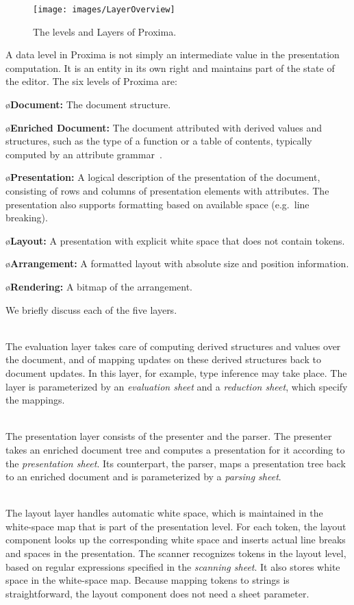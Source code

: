 \documentclass[12pt]{article}
\begin{document}
\begin{figure}[ht]
\centering
\texttt{[image: images/LayerOverview]}
\caption{The levels and Layers of Proxima.}
\label{fig:levelsAndLayers}
\end{figure}

A data level in Proxima is not simply an intermediate value in the presentation computation. It is an entity in its own right and maintains part of the state of the editor. The six levels of Proxima are:


\bl
\o {\bf Document:} The document structure.

\o {\bf Enriched Document:} The document attributed with derived values and structures, such as the type of a function or a table of contents, typically computed by an attribute grammar~\cite{reps84synGen}.

\o{\bf Presentation:} A logical description of the presentation of the document, consisting of rows and columns of presentation elements with attributes. The presentation also supports formatting based on available space (e.g.\ line breaking).

\o{\bf Layout:} A presentation with explicit white space that does not contain tokens.

\o{\bf Arrangement:} A formatted layout with absolute size and position information.

\o{\bf Rendering:} A bitmap of the arrangement.
\el

\pagebreak

\bc
We briefly discuss each of the five layers.

\\
The evaluation layer takes care of computing derived structures and values over the document, and of mapping updates on these derived structures back to document updates. In this layer, for example, type inference may take place. The layer is parameterized by an {\em evaluation sheet} and a {\em reduction sheet}, which specify the mappings. 

\\
The presentation layer consists of the presenter and the parser. The presenter takes an enriched document tree and computes a presentation for it according to the {\em presentation sheet}. Its counterpart, the parser, maps a presentation tree back to an enriched document and is parameterized by a {\em parsing sheet}.

\\
The layout layer handles automatic white space, which is maintained in the white-space map that is part of the presentation level. For each token, the layout component looks up the corresponding white space and inserts actual line breaks and spaces in the presentation. The scanner recognizes tokens in the layout level, based on regular expressions specified in the {\em scanning sheet}. It also stores white space in the white-space map. Because mapping tokens to strings is straightforward, the layout component does not need a sheet parameter.
\end{document}
